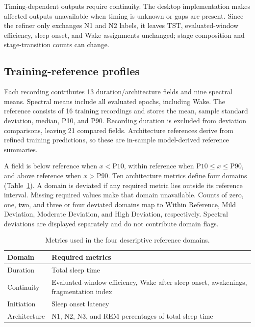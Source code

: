 \documentclass[pdflatex,sn-mathphys-num]{sn-jnl}
\begin{document}
Timing-dependent outputs require continuity. The desktop implementation makes affected outputs unavailable when timing is unknown or gaps are present. Since the refiner only exchanges N1 and N2 labels, it leaves TST, evaluated-window efficiency, sleep onset, and Wake assignments unchanged; stage composition and stage-transition counts can change.

\subsection{Training-reference profiles}
Each recording contributes 13 duration/architecture fields and nine spectral means. Spectral means include all evaluated epochs, including Wake. The reference consists of 16 training recordings and stores the mean, sample standard deviation, median, P10, and P90. Recording duration is excluded from deviation comparisons, leaving 21 compared fields. Architecture references derive from refined training predictions, so these are in-sample model-derived reference summaries.

A field is below reference when $x<\mathrm{P10}$, within reference when $\mathrm{P10}\leq x\leq\mathrm{P90}$, and above reference when $x>\mathrm{P90}$. Ten architecture metrics define four domains (Table~\ref{tab:domains}). A domain is deviated if any required metric lies outside its reference interval. Missing required values make that domain unavailable. Counts of zero, one, two, and three or four deviated domains map to Within Reference, Mild Deviation, Moderate Deviation, and High Deviation, respectively. Spectral deviations are displayed separately and do not contribute domain flags.

\begin{table}[htbp]
\caption{Metrics used in the four descriptive reference domains.}\label{tab:domains}
\centering
\begin{tabular}{lp{}}
\toprule
Domain & Required metrics \\
\midrule
Duration & Total sleep time \\
Continuity & Evaluated-window efficiency, Wake after sleep onset, awakenings, fragmentation index \\
Initiation & Sleep onset latency \\
Architecture & N1, N2, N3, and REM percentages of total sleep time \\
\bottomrule
\end{tabular}
\end{table}
\end{document}

